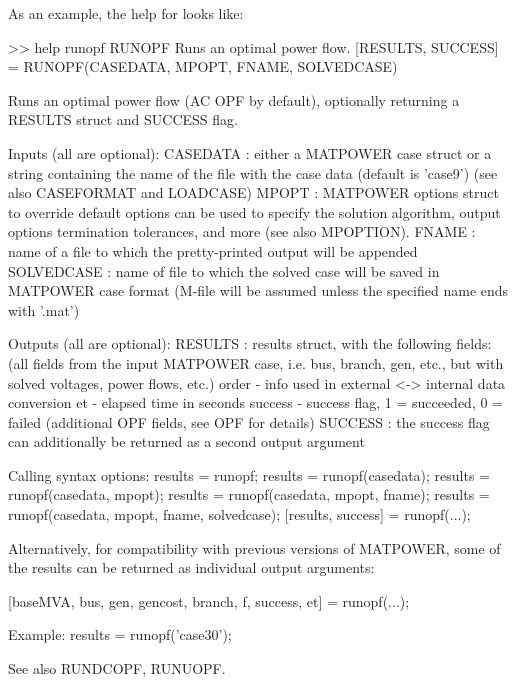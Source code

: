 \documentclass[12pt]{article}
\newcommand{\code}[1]{{\relsize{-0.5}{\tt{{#1}}}}}  %
\numberwithin{equation}{section}
\numberwithin{table}{section}
\numberwithin{figure}{section}
\begin{document}
As an example, the help for \code{runopf} looks like:
\begin{Code}
>> help runopf
 RUNOPF  Runs an optimal power flow.
    [RESULTS, SUCCESS] = RUNOPF(CASEDATA, MPOPT, FNAME, SOLVEDCASE)
 
    Runs an optimal power flow (AC OPF by default), optionally returning
    a RESULTS struct and SUCCESS flag.
 
    Inputs (all are optional):
        CASEDATA : either a MATPOWER case struct or a string containing
            the name of the file with the case data (default is 'case9')
            (see also CASEFORMAT and LOADCASE)
        MPOPT : MATPOWER options struct to override default options
            can be used to specify the solution algorithm, output options
            termination tolerances, and more (see also MPOPTION).
        FNAME : name of a file to which the pretty-printed output will
            be appended
        SOLVEDCASE : name of file to which the solved case will be saved
            in MATPOWER case format (M-file will be assumed unless the
            specified name ends with '.mat')
 
    Outputs (all are optional):
        RESULTS : results struct, with the following fields:
            (all fields from the input MATPOWER case, i.e. bus, branch,
                gen, etc., but with solved voltages, power flows, etc.)
            order - info used in external <-> internal data conversion
            et - elapsed time in seconds
            success - success flag, 1 = succeeded, 0 = failed
            (additional OPF fields, see OPF for details)
        SUCCESS : the success flag can additionally be returned as
            a second output argument
 
    Calling syntax options:
        results = runopf;
        results = runopf(casedata);
        results = runopf(casedata, mpopt);
        results = runopf(casedata, mpopt, fname);
        results = runopf(casedata, mpopt, fname, solvedcase);
        [results, success] = runopf(...);
 
        Alternatively, for compatibility with previous versions of MATPOWER,
        some of the results can be returned as individual output arguments:
 
        [baseMVA, bus, gen, gencost, branch, f, success, et] = runopf(...);
 
    Example:
        results = runopf('case30');
 
    See also RUNDCOPF, RUNUOPF.
\end{Code}
\end{document}
